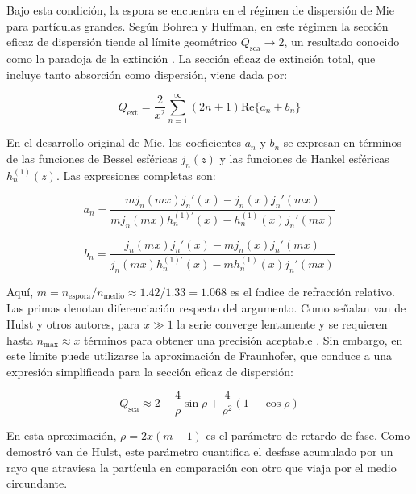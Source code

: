 \documentclass[12pt, a4paper]{article}
\begin{document}
	Bajo esta condición, la espora se encuentra en el régimen de dispersión de Mie para partículas grandes. Según Bohren y Huffman, en este régimen la sección eficaz de dispersión tiende al límite geométrico $Q_{\text{sca}} \rightarrow 2$, un resultado conocido como la paradoja de la extinción \parencite{bohren1983}. La sección eficaz de extinción total, que incluye tanto absorción como dispersión, viene dada por:
	
	\begin{equation}
		Q_{\text{ext}} = \frac{2}{x^2} \sum_{n=1}^{\infty} (2n+1) \text{Re}\{a_n + b_n\}
		\label{eq:q_ext_mie}
	\end{equation}
	
	En el desarrollo original de Mie, los coeficientes $a_n$ y $b_n$ se expresan en términos de las funciones de Bessel esféricas $j_n(z)$ y las funciones de Hankel esféricas $h_n^{(1)}(z)$. Las expresiones completas son:
	
	\begin{equation}
		a_n = \frac{m j_n(mx) j_n'(x) - j_n(x) j_n'(mx)}{m j_n(mx) h_n^{(1)'}(x) - h_n^{(1)}(x) j_n'(mx)}
		\label{eq:coeficiente_an}
	\end{equation}
	
	\begin{equation}
		b_n = \frac{j_n(mx) j_n'(x) - m j_n(x) j_n'(mx)}{j_n(mx) h_n^{(1)'}(x) - m h_n^{(1)}(x) j_n'(mx)}
		\label{eq:coeficiente_bn}
	\end{equation}
	
	Aquí, $m = n_{\text{espora}}/n_{\text{medio}} \approx 1.42/1.33 = 1.068$ es el índice de refracción relativo. Las primas denotan diferenciación respecto del argumento. Como señalan van de Hulst y otros autores, para $x \gg 1$ la serie converge lentamente y se requieren hasta $n_{\max} \approx x$ términos para obtener una precisión aceptable \parencite{vandeHulst1981}. Sin embargo, en este límite puede utilizarse la aproximación de Fraunhofer, que conduce a una expresión simplificada para la sección eficaz de dispersión:
	
	\begin{equation}
		Q_{\text{sca}} \approx 2 - \frac{4}{\rho} \sin\rho + \frac{4}{\rho^2}(1 - \cos\rho)
		\label{eq:q_sca_aproximado}
	\end{equation}
	
	En esta aproximación, $\rho = 2x(m-1)$ es el parámetro de retardo de fase. Como demostró van de Hulst, este parámetro cuantifica el desfase acumulado por un rayo que atraviesa la partícula en comparación con otro que viaja por el medio circundante.
	
\end{document}
